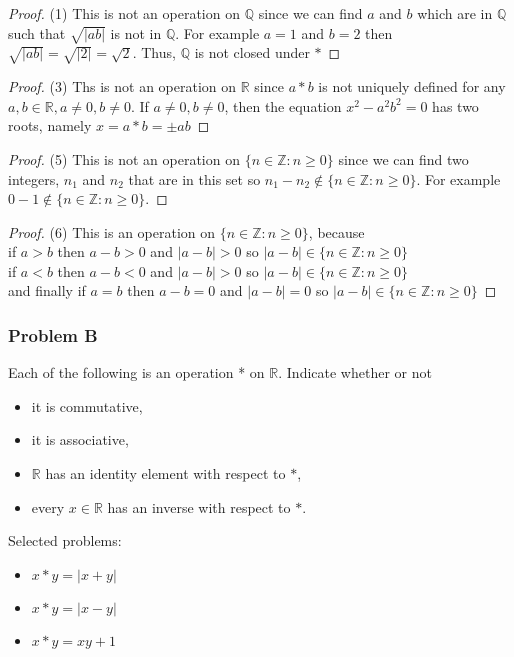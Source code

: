 \documentclass[11pt]{article}
\begin{document}
\begin{proof}{(1)}
This is not an operation on $\mathbb{Q}$ since we can find $a$ and $b$ which are in $\mathbb{Q}$ such that $\sqrt{\mathopen|ab\mathclose|}$ is not in $\mathbb{Q}$. For example $a=1$ and $b=2$ then $\sqrt{\mathopen|ab\mathclose|} = \sqrt{\mathopen|2\mathclose|} = \sqrt{2}$. Thus, $\mathbb{Q}$ is not closed under $*$
\end{proof} 
\begin{proof}{(3)}
Ths is not an operation on $\mathbb{R}$ since $a * b$ is not uniquely defined for any $a,b\in\mathbb{R},a\neq0,b\neq0$. If $a\neq0,b\neq0$, then the equation $x^2 - a^2b^2 = 0$ has two roots, namely $x=a*b=\pm ab$
\end{proof} 
\begin{proof}{(5)}
This is not an operation on $\{n \in \mathbb{Z}: n \geq 0\}$ since we can find two integers, $n_1$ and $n_2$ that are in this set so $n_1 - n_2 \not\in \{n \in \mathbb{Z}: n \geq 0\}$. For example $0 - 1 \not\in \{n \in \mathbb{Z}: n \geq 0\}$.
\end{proof}
\begin{proof}{(6)}
This is an operation on $\{n \in \mathbb{Z}: n \geq 0\}$, because \\
if $a > b$ then $a-b> 0$ and $\mathopen|a-b\mathclose|> 0$ so $\mathopen|a-b\mathclose| \in\{n \in \mathbb{Z}: n \geq 0\}$ \\
if $a < b$ then $a-b < 0$ and $\mathopen|a-b\mathclose|> 0$ so $\mathopen|a-b\mathclose| \in\{n \in \mathbb{Z}: n \geq 0\}$ \\
and finally if $a=b$ then $a-b=0$ and $\mathopen|a-b\mathclose|= 0$ so $\mathopen|a-b\mathclose| \in\{n \in \mathbb{Z}: n \geq 0\}$
\end{proof}

\cleardoublepage 
\subsubsection*{Problem B}

Each of the following is an operation * on $\mathbb{R}$. Indicate whether or not
\begin{itemize}
\item [(i)] it is commutative,
\item [(ii)] it is associative,
\item [(iii)] $\mathbb{R}$ has an identity element with respect to $*$,
\item [(iv)] every $x \in \mathbb{R}$ has an inverse with respect to $*$.
\end{itemize}
Selected problems:
\begin{itemize}
\item [3.] $x*y=\mathopen|x+y\mathclose|$
\item [4.] $x*y=\mathopen|x-y\mathclose|$
\item [5.] $x * y = xy+1$
\end{itemize}
\end{document}
